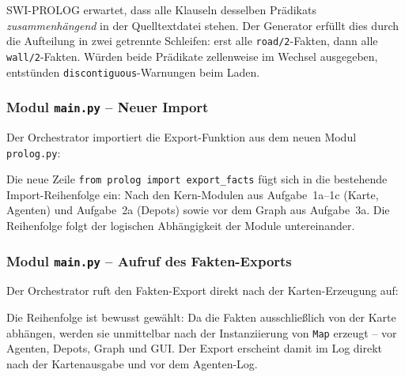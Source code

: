 \acs{SWI}-\acs{PROLOG} erwartet, dass alle Klauseln desselben Prädikats \textit{zusammenhängend} in der Quelltextdatei stehen. Der Generator erfüllt dies durch die Aufteilung in zwei getrennte Schleifen: erst alle \texttt{road/2}-Fakten, dann alle \texttt{wall/2}-Fakten. Würden beide Prädikate zellenweise im Wechsel ausgegeben, entstünden \texttt{discontiguous}-Warnungen beim Laden.


\subsubsection{Modul \texttt{main.py} – Neuer Import}

Der Orchestrator importiert die Export-Funktion aus dem neuen Modul \texttt{prolog.py}:



Die neue Zeile \texttt{from prolog import export\_facts} fügt sich in die bestehende Import-Reihenfolge ein: Nach den Kern-Modulen aus Aufgabe~1a--1c (Karte, Agenten) und Aufgabe~2a (Depots) sowie vor dem Graph aus Aufgabe~3a. Die Reihenfolge folgt der logischen Abhängigkeit der Module untereinander.


\subsubsection{Modul \texttt{main.py} – Aufruf des Fakten-Exports}

Der Orchestrator ruft den Fakten-Export direkt nach der Karten-Erzeugung auf:



Die Reihenfolge ist bewusst gewählt: Da die Fakten ausschließlich von der Karte abhängen, werden sie unmittelbar nach der Instanziierung von \texttt{Map} erzeugt -- vor Agenten, Depots, Graph und \acs{GUI}. Der Export erscheint damit im Log direkt nach der Kartenausgabe und vor dem Agenten-Log.


